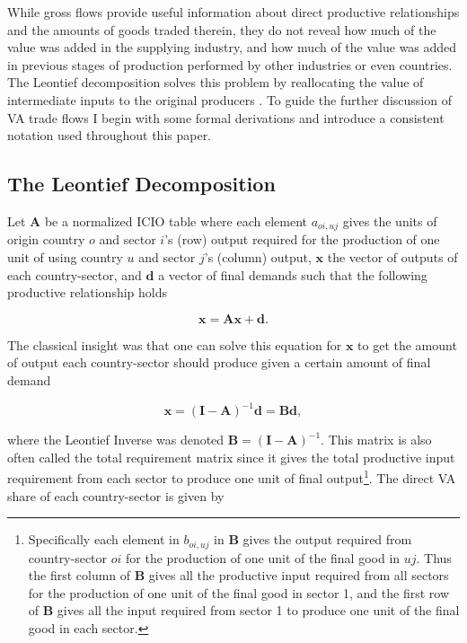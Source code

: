 \documentclass[a4paper]{article}
\begin{document}
While gross flows provide useful information about direct productive relationships and the amounts of goods traded therein, they do not reveal how much of the value was added in the supplying industry, and how much of the value was added in previous stages of production performed by other industries or even countries. %
The Leontief decomposition solves this problem by reallocating the value of intermediate inputs to the original producers \citep{Kummritz2014}. To guide the further discussion of VA trade flows I begin with some formal derivations and introduce a consistent notation used throughout this paper. 


\subsection{The Leontief Decomposition}

Let $\textbf{A}$ be a normalized ICIO table where each element $a_{oi,uj}$ gives the units of origin country $o$ and sector $i$'s (row) output required for the production of one unit of using country $u$ and sector $j$'s (column) output, $\textbf{x}$ the vector of outputs of each country-sector, and $\textbf{d}$ a vector of final demands such that the following productive relationship holds

\begin{equation}
\textbf{x} = \textbf{A}\textbf{x} + \textbf{d}.
\end{equation}

The classical \citet{leontief1936quantitative} insight was that one can solve this equation for $\textbf{x}$ to get the amount of output each country-sector should produce given a certain amount of final demand

\begin{equation} \label{eq:leontief}
\textbf{x} = (\textbf{I}-\textbf{A})^{-1} \textbf{d} = \textbf{B}\textbf{d},
\end{equation}

\noindent where the Leontief Inverse was denoted $\textbf{B} = (\textbf{I}-\textbf{A})^{-1}$. This matrix is also often called the total requirement matrix since it gives the total productive input requirement from each sector to produce one unit of final output\footnote{Specifically each element in $b_{oi,uj}$ in \textbf{B} gives the output required from country-sector $oi$ for the production of one unit of the final good in $uj$. Thus the first column of \textbf{B} gives all the productive input required from all sectors for the production of one unit of the final good in sector 1, and the first row of \textbf{B} gives all the input required from sector 1 to produce one unit of the final good in each sector.}. The direct VA share of each country-sector is given by
\end{document}
